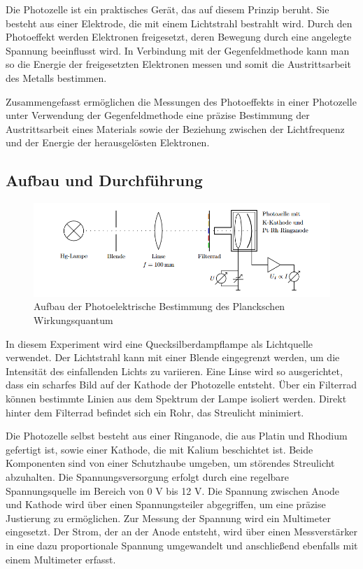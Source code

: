 \documentclass{article}
\begin{document}
Die Photozelle ist ein praktisches Gerät, das auf diesem Prinzip beruht. Sie besteht aus einer 
Elektrode, die mit einem Lichtstrahl bestrahlt wird. Durch den Photoeffekt werden Elektronen 
freigesetzt, deren Bewegung durch eine angelegte Spannung beeinflusst wird. In Verbindung mit 
der Gegenfeldmethode kann man so die Energie der freigesetzten Elektronen messen und somit die 
Austrittsarbeit des Metalls bestimmen.

Zusammengefasst ermöglichen die Messungen des Photoeffekts in einer Photozelle unter 
Verwendung der Gegenfeldmethode eine präzise Bestimmung der Austrittsarbeit eines Materials 
sowie der Beziehung zwischen der Lichtfrequenz und der Energie der herausgelösten Elektronen.

\subsection{Aufbau und Durchführung}
\begin{figure}[h!]
  \centering
  \includegraphics[width=.8\linewidth]{Aufbau_Wirkugsquantum}
  \caption{Aufbau der Photoelektrische Bestimmung des Planckschen Wirkungsquantum}
  \label{fig:aufbau_wirkungs}
\end{figure}

In diesem Experiment wird eine Quecksilberdampflampe als Lichtquelle verwendet. Der Lichtstrahl
 kann mit einer Blende eingegrenzt werden, um die Intensität des einfallenden Lichts zu variieren. Eine Linse wird so ausgerichtet, dass ein scharfes Bild auf der Kathode der Photozelle entsteht. Über ein Filterrad können bestimmte Linien aus dem Spektrum der Lampe isoliert werden. Direkt hinter dem Filterrad befindet sich ein Rohr, das Streulicht minimiert.

Die Photozelle selbst besteht aus einer Ringanode, die aus Platin und Rhodium gefertigt 
ist, sowie einer Kathode, die mit Kalium beschichtet ist. Beide Komponenten sind von einer 
Schutzhaube umgeben, um störendes Streulicht abzuhalten. Die Spannungsversorgung erfolgt 
durch eine regelbare Spannungsquelle im Bereich von 0 V bis 12 V. Die Spannung zwischen 
Anode und Kathode wird über einen Spannungsteiler abgegriffen, um eine präzise Justierung 
zu ermöglichen. Zur Messung der Spannung wird ein Multimeter eingesetzt. Der Strom, der 
an der Anode entsteht, wird über einen Messverstärker in eine dazu proportionale Spannung 
umgewandelt und anschließend ebenfalls mit einem Multimeter erfasst.
\end{document}
